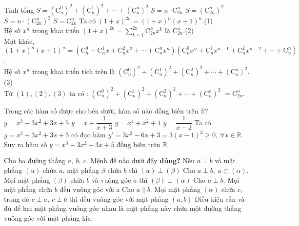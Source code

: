 \begin{ex}%
	Tính tổng $S=\left(\mathrm{C}_n^0\right)^2+\left(\mathrm{C}_n^1\right)^2+\cdots+\left(\mathrm{C}_n^n\right)^2$
	\choice
	{$S=n\cdot\mathrm{C}_{2n}^n$}
	{$S=\left(\mathrm{C}_{2n}^n\right)^2$}
	{$S=n\cdot\left(\mathrm{C}_{2n}^n\right)^2$}
	{\True $S=\mathrm{C}_{2n}^n$}
	\loigiai
	{
		Ta có $(1+x)^{2n}=(1+x)^n(x+1)^n$.\qquad(1)\\
		Hệ số $x^n$ trong khai triển $(1+x)^{2n}=\displaystyle \sum_{k=1}^{2n}\mathrm{C}_{2n}^{k}x^k$ là $\mathrm{C}_{2n}^{n}$.\qquad(2)\\
		Mặt khác, $(1+x)^n(x+1)^n=(\mathrm{C}_n^0+\mathrm{C}_n^1x+\mathrm{C}_n^2x^2+\cdots+\mathrm{C}_n^nx^n)(\mathrm{C}_n^0x^n+\mathrm{C}_n^1x^{n-1}+\mathrm{C}_n^2x^{n-2}+\cdots+\mathrm{C}_n^n)$.\\
		Hệ số $x^n$ trong khai triển tích trên là $(\mathrm{C}_n^0)^2+(\mathrm{C}_n^1)^2+(\mathrm{C}_n^2)^2+\cdots+(\mathrm{C}_n^n)^2$.\qquad(3)\\
		Từ $(1), (2), (3)$ ta có : $(\mathrm{C}_n^0)^2+(\mathrm{C}_n^1)^2+(\mathrm{C}_n^2)^2+\cdots+(\mathrm{C}_n^n)^2$ $=\mathrm{C}_{2n}^{n}$.
	}
\end{ex}

\begin{ex}%
	Trong các hàm số được cho bên dưới, hàm số nào đồng biến trên $\mathbb{R}$?
	\choice
	{\True $y=x^3-3x^2+3x+5$}
	{$y=x+\dfrac{1}{x+3}$}
	{$y=x^4+x^2+1$}
	{$y=\dfrac{1}{x-2}$}
	\loigiai
	{
		Ta có $y=x^3-3x^2+3x+5$ có đạo hàm $y'=3x^2-6x+3=3(x-1)^2\ge0,~\forall x \in \mathbb{R}$.\\
		Suy ra hàm số $y=x^3-3x^2+3x+5$ đồng biến trên $\mathbb{R}$.
	}
\end{ex}

\begin{ex}%
	Cho ba đường thẳng $a,~b,~c$. Mệnh đề nào dưới đây \textbf{đúng?}
	\choice
	{Nếu $a\perp b$ và mặt phẳng $(\alpha)$ chứa $a$, mặt phẳng $\beta$ chứa $b$ thì $(\alpha) \perp (\beta)$}
	{\True Cho $a\perp b,~a \subset (\alpha)$. Mọi mặt phẳng $(\beta)$ chứa $b$ và vuông góc $a$ thì $(\beta) \perp (\alpha)$}
	{Cho $a \perp b$. Mọi mặt phẳng chứa $b$ đều vuông góc với a}
	{Cho $a \parallel b$. Mọi mặt phẳng $(\alpha)$ chứa $c$, trong đó $c \perp a,~c\perp b$ thì đều vuông góc với mặt phẳng $(a,b)$}
	\loigiai
	{
		Điều kiện cần và đủ để hai mặt phẳng vuông góc nhau là mặt phẳng này chứa một đường thẳng vuông góc với mặt phẳng kia. 
	}
\end{ex}

